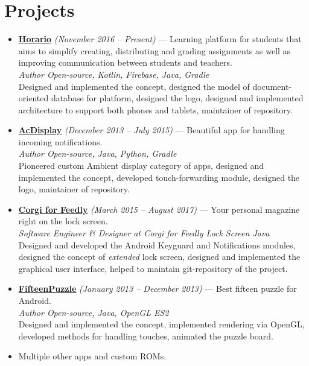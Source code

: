 \documentclass[a4paper]{article}
\begin{document}
	\section*{Projects}
	\begin{itemize}
		\item \href{http://artemchep.com/horario/}{\textbf{Horario}} \textit{(November 2016 -- Present)} --- Learning platform for students that aims to simplify creating, distributing and grading assignments as well as improving communication between students and teachers. \\[0.2em]
		{\footnotesize \textit{Author \hfill Open-source, Kotlin, Firebase, Java, Gradle}} \\[0.2em]
		Designed and implemented the concept, designed the model of document-oriented database for platform, designed the logo, designed and implemented architecture to support both phones and tablets, maintainer of repository.
		
		\item \href{http://artemchep.com/acdisplay/}{\textbf{AcDisplay}} \textit{(December 2013 -- July 2015)} --- Beautiful app for handling incoming notifications. \\[0.2em]
		{\footnotesize \textit{Author \hfill Open-source, Java, Python, Gradle}} \\[0.2em]
		Pioneered custom Ambient display category of apps, designed and implemented the concept, developed touch-forwarding module, designed the logo, maintainer of repository.   

		\item \href{https://play.google.com/store/apps/details?id=com.swipe.android}{\textbf{Corgi for Feedly}} \textit{(March 2015 – August 2017)} --- Your personal magazine right on the lock screen. \\[0.2em]
		{\footnotesize \textit{Software Engineer \& Designer at Corgi for Feedly Lock Screen \hfill Java}} \\[0.2em]
		Designed and developed the Android Keyguard and Notifications modules, designed the concept of \textit{extended} lock screen, designed and implemented the graphical user interface, helped to maintain git-repository of the project.
		
		\item \href{https://play.google.com/store/apps/details?id=com.achep.fifteenpuzzle}{\textbf{FifteenPuzzle}} \textit{(January 2013 -- December 2013)} --- Best fifteen puzzle for Android. \\[0.2em]
		{\footnotesize \textit{Author \hfill Open-source, Java, OpenGL ES2}} \\[0.2em]
		Designed and implemented the concept, implemented rendering via OpenGL, developed methods for handling touches, animated the puzzle board.
		
		\item Multiple other apps and custom ROMs.
	\end{itemize}
\end{document}
